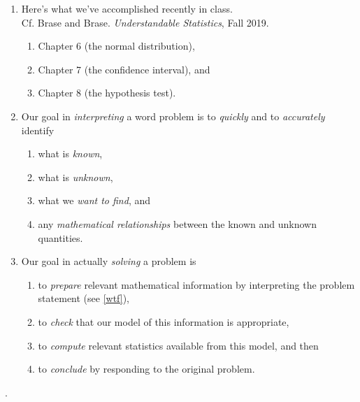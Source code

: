 \documentclass{ccg-topic}
\begin{document}
\begin{center}
\end{center}
\begin{enumerate}
    \item Here's what we've accomplished recently in class.
\\ Cf. Brase and Brase. \emph{Understandable Statistics},  Fall 2019. 
    \begin{enumerate}
        \item Chapter 6 (the normal distribution),
        \item Chapter 7 (the confidence interval), and
        \item Chapter 8 (the hypothesis test).
    \end{enumerate}
    
    \item Our goal in \emph{interpreting} a word problem is to \emph{quickly} and to \emph{accurately} identify
        \begin{enumerate}
    \label{wtf}
        \def\labelenumi{\arabic{enumi}.}
        \item
          what is \emph{known},
        \item
          what is \emph{unknown},
        \item
          what we \emph{want to find}, and
        \item
          any \emph{mathematical relationships} between the known and unknown
          quantities.
        \end{enumerate}
    
    
    \item Our goal in actually \emph{solving} a problem is
    
        \begin{enumerate}
        \def\labelenumi{\arabic{enumi}.}
        \item
          to \emph{prepare} relevant mathematical information by interpreting the problem statement (see \eqref{wtf}),
        \item
          to \emph{check} that  
our model of this information is appropriate,
        \item
          to \emph{compute} relevant statistics available from this model, and then
        \item
          to \emph{conclude} by responding to the
          original problem.
        \end{enumerate}
    \end{enumerate}

\newpage
.
\vspace{65em}


\hfill
\end{document}
